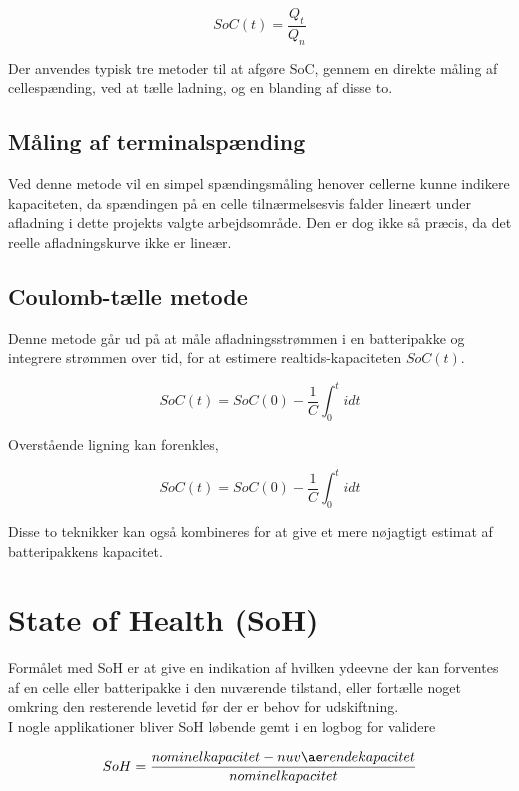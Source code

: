 \begin {equation} 
SoC(t) = \frac{Q_t}{Q_n} \label{eq:soc}
\end {equation}

Der anvendes typisk tre metoder til at afgøre SoC, gennem en direkte måling af cellespænding, ved at tælle ladning, og en blanding af disse to.

\subsection{Måling af terminalspænding}
Ved denne metode vil en simpel spændingsmåling henover cellerne kunne indikere kapaciteten, da spændingen på en celle tilnærmelsesvis falder lineært under afladning i dette projekts valgte arbejdsområde. Den er dog ikke så præcis, da det reelle afladningskurve ikke er lineær.


\subsection{Coulomb-tælle metode}
Denne metode går ud på at måle afladningsstrømmen i en batteripakke og integrere strømmen over tid, for at estimere realtids-kapaciteten $SoC(t)$. 

\begin {equation} 
SoC(t) = SoC(0) - \frac{1}{C} \int_{0}^{t} idt  \label{eq:coulomb-count}
\end {equation}

Overstående ligning kan forenkles,

\begin {equation} 
SoC(t) = SoC(0) - \frac{1}{C} \int_{0}^{t} idt  \label{eq:coulomb-count}
\end {equation}

Disse to teknikker kan også kombineres for at give et mere nøjagtigt estimat af batteripakkens kapacitet.

\section{State of Health (SoH)}
Formålet med SoH er at give en indikation af hvilken ydeevne der kan forventes af en celle eller batteripakke i den nuværende tilstand, eller fortælle noget omkring den resterende levetid før der er behov for udskiftning.
\\
I nogle applikationer bliver SoH løbende gemt i en logbog for validere

\begin {equation} 
SoH = \frac{nominel \space kapacitet - nuværende  kapacitet}{nominel kapacitet} \label{eq:soh}
\end {equation}

